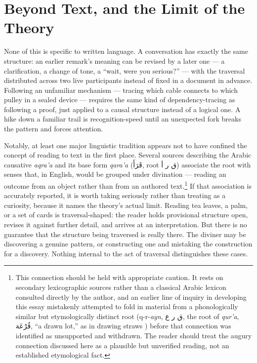 \documentclass[11pt]{article}
\begin{document}
\section{Beyond Text, and the Limit of the Theory}

None of this is specific to written language. A conversation has exactly the same structure: an earlier remark's meaning can be revised by a later one --- a clarification, a change of tone, a ``wait, were you serious?'' --- with the traversal distributed across two live participants instead of fixed in a document in advance. Following an unfamiliar mechanism --- tracing which cable connects to which pulley in a sealed device --- requires the same kind of dependency-tracing as following a proof, just applied to a causal structure instead of a logical one. A hike down a familiar trail is recognition-speed until an unexpected fork breaks the pattern and forces attention.

Notably, at least one major linguistic tradition appears not to have confined the concept of reading to text in the first place. Several sources describing the Arabic causative \emph{aqra'a} and its base form \emph{qara'a} ({\arabicfont قَرَأَ}, root {\arabicfont ق ر أ}) associate the root with senses that, in English, would be grouped under divination --- reading an outcome from an object rather than from an authored text.\footnote{This connection should be held with appropriate caution. It rests on secondary lexicographic sources rather than a classical Arabic lexicon consulted directly by the author, and an earlier line of inquiry in developing this essay mistakenly attempted to fold in material from a phonologically similar but etymologically distinct root (q-r-\textit{ayn}, {\arabicfont ق ر ع}, the root of \emph{qur'a}, {\arabicfont قُرْعَة}, ``a drawn lot,'' as in drawing straws \citep{wiktionary-qura}) before that connection was identified as unsupported and withdrawn. The reader should treat the augury connection discussed here as a plausible but unverified reading, not an established etymological fact.} If that association is accurately reported, it is worth taking seriously rather than treating as a curiosity, because it names the theory's actual limit. Reading tea leaves, a palm, or a set of cards is traversal-shaped: the reader holds provisional structure open, revises it against further detail, and arrives at an interpretation. But there is no guarantee that the structure being traversed is really there. The diviner may be discovering a genuine pattern, or constructing one and mistaking the construction for a discovery. Nothing internal to the act of traversal distinguishes these cases.
\end{document}
